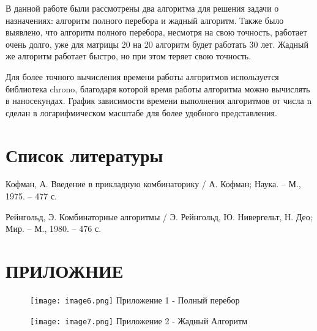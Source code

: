\documentclass[]{article}
\begin{document}
В данной работе были рассмотрены два алгоритма для решения задачи о
назначениях: алгоритм полного перебора и жадный алгоритм. Также было
выявлено, что алгоритм полного перебора, несмотря на свою точность,
работает очень долго, уже для матрицы 20 на 20 алгоритм будет работать
30 лет. Жадный же алгоритм работает быстро, но при этом теряет свою
точность.

Для более точного вычисления времени работы алгоритмов используется
библиотека chrono, благодаря которой время работы алгоритма можно
вычислять в наносекундах. График зависимости времени выполнения
алгоритмов от числа n сделан в логарифмическом масштабе для более
удобного представления.

\hypertarget{Список литературы}{%
\section{Список
литературы}\label{Список литературы}}

Кофман, А. Введение в прикладную комбинаторику / А. Кофман; Наука. --
М., 1975. -- 477 с.

Рейнгольд, Э. Комбинаторные алгоритмы / Э. Рейнгольд, Ю. Нивергельт, Н.
Део; Мир. -- М., 1980. -- 476 с.
\newpage
\hypertarget{Приложение}{%
\section{ПРИЛОЖНИЕ}\label{Приложение}}

\begin{figure}
    \centering
    \texttt{[image: image6.png]}
    Приложение 1 - Полный перебор
    \label{fig:enter-label}
\end{figure}


\begin{figure}
    \centering
    \texttt{[image: image7.png]}
    Приложение 2 - Жадный Алгоритм
    \label{fig:enter-label}
\end{figure}
\end{document}

